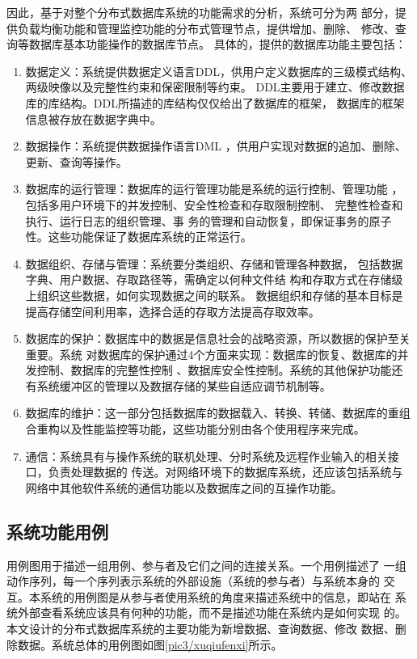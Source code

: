 	因此，基于对整个分布式数据库系统的功能需求的分析，系统可分为两
	部分，提供负载均衡功能和管理监控功能的分布式管理节点，提供增加、删除、
	修改、查询等数据库基本功能操作的数据库节点。
具体的，提供的数据库功能主要包括：
\begin{enumerate}
	\item 数据定义：系统提供数据定义语言DDL，供用户定义数据库的三级模式结构、两级映像以及完整性约束和保密限制等约束。
	DDL主要用于建立、修改数据库的库结构。DDL所描述的库结构仅仅给出了数据库的框架，
	数据库的框架信息被存放在数据字典中。
	\item 数据操作：系统提供数据操作语言DML
	，供用户实现对数据的追加、删除、更新、查询等操作。
	\item 数据库的运行管理：数据库的运行管理功能是系统的运行控制、管理功能
	，包括多用户环境下的并发控制、安全性检查和存取限制控制、
	完整性检查和执行、运行日志的组织管理、事
	务的管理和自动恢复，即保证事务的原子性。这些功能保证了数据库系统的正常运行。
	\item 数据组织、存储与管理：系统要分类组织、存储和管理各种数据，
	包括数据字典、用户数据、存取路径等，需确定以何种文件结
	构和存取方式在存储级上组织这些数据，如何实现数据之间的联系。
	数据组织和存储的基本目标是提高存储空间利用率，选择合适的存取方法提高存取效率。
	\item   数据库的保护：数据库中的数据是信息社会的战略资源，所以数据的保护至关重要。系统
	对数据库的保护通过4个方面来实现：数据库的恢复、数据库的并发控制、数据库的完整性控制
	、数据库安全性控制。系统的其他保护功能还有系统缓冲区的管理以及数据存储的某些自适应调节机制等。
	\item  数据库的维护：这一部分包括数据库的数据载入、转换、转储、数据库的重组合重构以及性能监控等功能，这些功能分别由各个使用程序来完成。
	\item 通信：系统具有与操作系统的联机处理、分时系统及远程作业输入的相关接口，负责处理数据的
	传送。对网络环境下的数据库系统，还应该包括系统与网络中其他软件系统的通信功能以及数据库之间的互操作功能。
\end{enumerate}
\subsection{系统功能用例}
用例图用于描述一组用例、参与者及它们之间的连接关系。一个用例描述了
一组动作序列，每一个序列表示系统的外部设施（系统的参与者）与系统本身的
交互。本系统的用例图是从参与者使用系统的角度来描述系统中的信息，即站在
系统外部查看系统应该具有何种的功能，而不是描述功能在系统内是如何实现
的。本文设计的分布式数据库系统的主要功能为新增数据、查询数据、修改
数据、删除数据。系统总体的用例图如图\ref{pic3/xuqiufenxi}所示。

